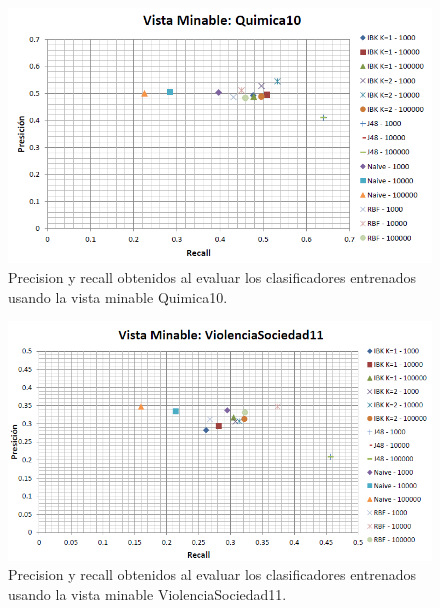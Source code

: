 \documentclass{article}
\begin{document}
\begin{figure}[!htb]
\begin{centering}
\includegraphics[scale=0.7]{quimica10}
\par\end{centering}
\caption{Precision y recall obtenidos al evaluar los clasificadores entrenados usando la vista minable Quimica10.}
\label{fig:figura23}
\end{figure}
\clearpage
\begin{figure}[!htb]
\begin{centering}
\includegraphics[scale=0.7]{violenciasociedad11}
\par\end{centering}
\caption{Precision y recall obtenidos al evaluar los clasificadores entrenados usando la vista minable ViolenciaSociedad11.}
\label{fig:figura23}
\end{figure}
\end{document}
